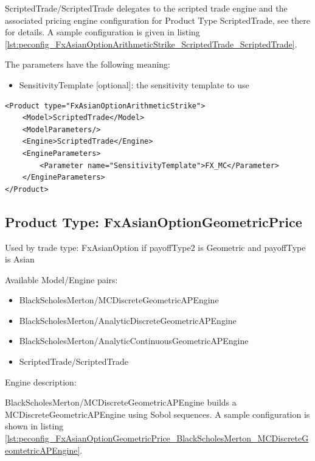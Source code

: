 ScriptedTrade/ScriptedTrade delegates to the scripted trade engine and the associated pricing engine configuration for
Product Type ScriptedTrade, see there for details. A sample configuration is given in listing
\ref{lst:peconfig_FxAsianOptionArithmeticStrike_ScriptedTrade_ScriptedTrade}.

The parameters have the following meaning:

\begin{itemize}
\item SensitivityTemplate [optional]: the sensitivity template to use
\end{itemize}

\begin{longlisting}
\begin{verbatim}
<Product type="FxAsianOptionArithmeticStrike">
    <Model>ScriptedTrade</Model>
    <ModelParameters/>
    <Engine>ScriptedTrade</Engine>
    <EngineParameters>
        <Parameter name="SensitivityTemplate">FX_MC</Parameter>
    </EngineParameters>
</Product>
\end{verbatim}
\caption{Configuration for Product FxAsianOptionArithmeticStrike, Model ScriptedTrade, Engine ScriptedTrade}
\label{lst:peconfig_FxAsianOptionArithmeticStrike_ScriptedTrade_ScriptedTrade}
\end{longlisting}

\subsection{Product Type: FxAsianOptionGeometricPrice}

Used by trade type: FxAsianOption if payoffType2 is Geometric and payoffType is Asian

Available Model/Engine pairs:

\begin{itemize}
  \item BlackScholesMerton/MCDiscreteGeometricAPEngine
  \item BlackScholesMerton/AnalyticDiscreteGeometricAPEngine
  \item BlackScholesMerton/AnalyticContinuousGeometricAPEngine
  \item ScriptedTrade/ScriptedTrade
\end{itemize}

Engine description:

BlackScholesMerton/MCDiscreteGeometricAPEngine builds a MCDiscreteGeometricAPEngine using Sobol sequences. A sample
configuration is shown in listing
\ref{lst:peconfig_FxAsianOptionGeometricPrice_BlackScholesMerton_MCDiscreteGeomtetricAPEngine}.


